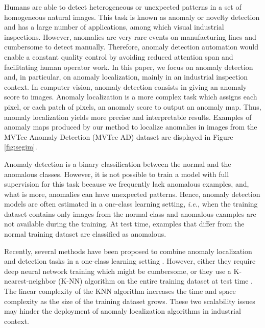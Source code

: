 \documentclass[a4paper,conference]{IEEEtran}
\begin{document}
Humans are able to detect heterogeneous or unexpected patterns in a set of homogeneous natural images. This task is known as anomaly or novelty detection and has a large number of applications, among which visual industrial inspections. However, anomalies are very rare events on manufacturing lines and cumbersome to detect manually. Therefore, anomaly detection automation would enable a constant quality control by avoiding reduced attention span and facilitating human operator work.
In this paper, we focus on anomaly detection and, in particular, on anomaly localization, mainly in an industrial inspection context. In computer vision, anomaly detection consists in giving an anomaly score to images. Anomaly localization is a more complex task which assigns each pixel, or each patch of pixels, an anomaly score to output an anomaly map. Thus, anomaly localization yields more precise and interpretable results. Examples of anomaly maps produced by our method to localize anomalies in images from the  MVTec Anomaly Detection (MVTec AD) dataset \cite{bergmann2019mvtec} are displayed in Figure \ref{fig:segim}.



Anomaly detection is a binary classification between the normal and the anomalous classes. However, it is not possible to train a model with full supervision for this task because we frequently lack anomalous examples, and, what is more, anomalies can have unexpected patterns. Hence, anomaly detection models are often estimated in a one-class learning setting,  \textit{i.e.}, when the training dataset contains only images from the normal class and anomalous examples are not available during the training. At test time, examples that differ from the normal training dataset are classified as anomalous. 



Recently, several methods have been proposed to combine anomaly localization and detection tasks in a one-class learning setting \cite{bergmann2019uninformed, venkataramanan2019attention, yi2020patch, cohen2020subimage}. However, either they require deep neural network training \cite{Bergman2020Classification-Based, venkataramanan2019attention} which might be cumbersome, or they use a K-nearest-neighbor (K-NN)  algorithm  \cite{knn} on the entire training dataset at test time \cite{yi2020patch, cohen2020subimage}. The linear complexity of the KNN algorithm increases the time and space complexity as the size of the training dataset grows. These two scalability issues may hinder the deployment of anomaly localization algorithms in industrial context.
\end{document}
